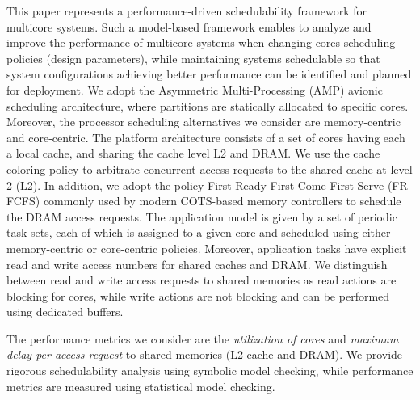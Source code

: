 This paper represents a performance-driven schedulability framework for multicore systems. Such a model-based framework  
enables to analyze and improve the performance of multicore systems when changing cores scheduling policies (design parameters), while maintaining systems schedulable so that system configurations achieving better performance can be identified and planned for deployment. We adopt the Asymmetric Multi-Processing (AMP) \cite{Huyck12} avionic scheduling architecture, where partitions are statically allocated to specific cores. Moreover, the processor scheduling alternatives we consider are memory-centric and core-centric. The platform architecture consists of a set of cores having each a local cache, and sharing the cache level L2 and DRAM. We use the cache coloring policy \cite{Hyoseung13} to arbitrate concurrent access requests to the shared cache at level 2 (L2). In addition, we adopt the policy {First Ready-First Come First Serve (FR-FCFS)} \cite{Rixner2000,Kim14} commonly used by modern COTS-based memory controllers to schedule the DRAM access requests.   
%
The application model is given by a set of periodic task sets, each of which is assigned to a given core and scheduled using either memory-centric or core-centric policies. Moreover, application tasks have explicit read and write access numbers for shared caches and DRAM. We distinguish between read and write access requests to shared memories as read actions are blocking for cores, while write actions are not blocking and can be performed using dedicated buffers.

The performance metrics we consider are the \textit{utilization of cores} and \textit{maximum delay per access request} to shared memories (L2 cache and DRAM). We provide rigorous schedulability analysis using symbolic model checking, while performance metrics are measured using statistical model checking. %


 





